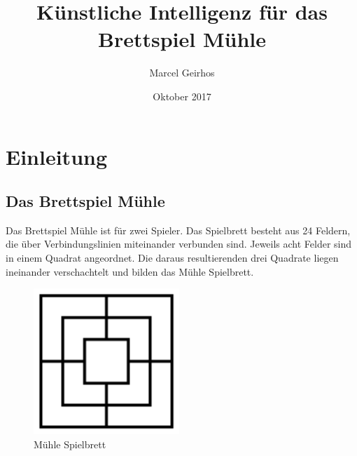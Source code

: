 \documentclass[oneside]{ausarbeitung}
\begin{document}



\author{Marcel Geirhos}
\title{\textbf{Künstliche Intelligenz für das Brettspiel Mühle}}

\date{Oktober 2017}

\maketitle

\setcounter{page}{1}

\tableofcontents


\nocite{*}

\listoffigures

\listoftables

\setcounter{page}{1}

\chapter{Einleitung}

\section{Das Brettspiel Mühle}

Das Brettspiel Mühle ist für zwei Spieler. Das Spielbrett besteht aus 24 Feldern, die über Verbindungslinien miteinander verbunden sind. Jeweils acht Felder sind in einem Quadrat angeordnet. Die daraus resultierenden drei Quadrate liegen ineinander verschachtelt und bilden das Mühle Spielbrett.

\begin{figure}[ht]
	\centering
	\includegraphics[width=5.5cm,height=5.5cm]{images/gameboard.png}
	\caption[Mühle Spielbrett]{Mühle Spielbrett}
\end{figure}
\end{document}
